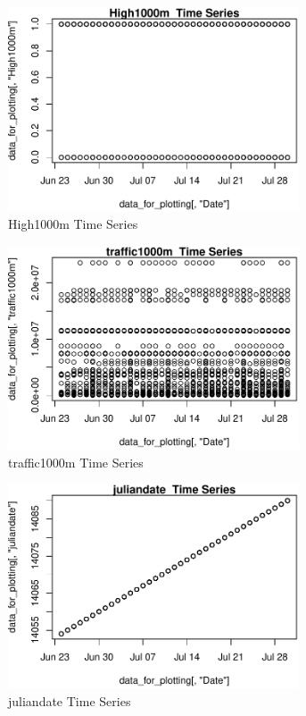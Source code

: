 \begin{figure} 
\centering  
\includegraphics[width=0.77\textwidth]{Code_Outputs/ML_input_report_AllforCaret_cleaned_StepPractice_part_practice_High1000mTS.pdf} 
\caption{\label{fig:ML_input_report_AllforCaret_cleaned_StepPractice_part_practiceHigh1000mTS}High1000m  Time Series} 
\end{figure} 
 

\begin{figure} 
\centering  
\includegraphics[width=0.77\textwidth]{Code_Outputs/ML_input_report_AllforCaret_cleaned_StepPractice_part_practice_traffic1000mTS.pdf} 
\caption{\label{fig:ML_input_report_AllforCaret_cleaned_StepPractice_part_practicetraffic1000mTS}traffic1000m  Time Series} 
\end{figure} 
 

\begin{figure} 
\centering  
\includegraphics[width=0.77\textwidth]{Code_Outputs/ML_input_report_AllforCaret_cleaned_StepPractice_part_practice_juliandateTS.pdf} 
\caption{\label{fig:ML_input_report_AllforCaret_cleaned_StepPractice_part_practicejuliandateTS}juliandate  Time Series} 
\end{figure} 
 

